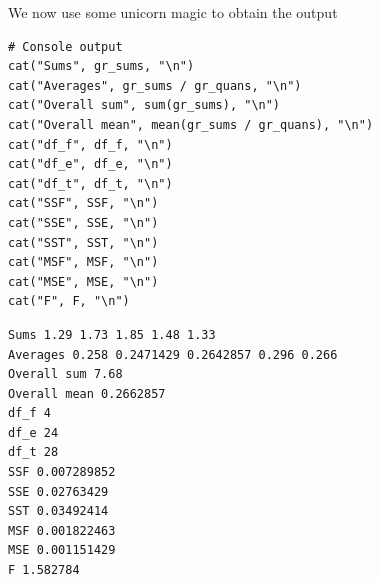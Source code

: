 \documentclass[a4paper]{article}
\numberwithin{equation}{section}
\begin{document}
We now use some unicorn magic to obtain the output
\begin{mdframed}[leftline=false,rightline=false,backgroundcolor=magenta!10,nobreak=true]
  \begin{verbatim}
# Console output
cat("Sums", gr_sums, "\n")
cat("Averages", gr_sums / gr_quans, "\n")
cat("Overall sum", sum(gr_sums), "\n")
cat("Overall mean", mean(gr_sums / gr_quans), "\n")
cat("df_f", df_f, "\n")
cat("df_e", df_e, "\n")
cat("df_t", df_t, "\n")
cat("SSF", SSF, "\n")
cat("SSE", SSE, "\n")
cat("SST", SST, "\n")
cat("MSF", MSF, "\n")
cat("MSE", MSE, "\n")
cat("F", F, "\n")
  \end{verbatim}
\end{mdframed}

\begin{mdframed}[leftline=false,rightline=false,backgroundcolor=magenta!10,nobreak=true]
  \begin{verbatim}
Sums 1.29 1.73 1.85 1.48 1.33
Averages 0.258 0.2471429 0.2642857 0.296 0.266
Overall sum 7.68
Overall mean 0.2662857
df_f 4
df_e 24
df_t 28
SSF 0.007289852
SSE 0.02763429
SST 0.03492414
MSF 0.001822463
MSE 0.001151429
F 1.582784
  \end{verbatim}
\end{mdframed}
\end{document}
